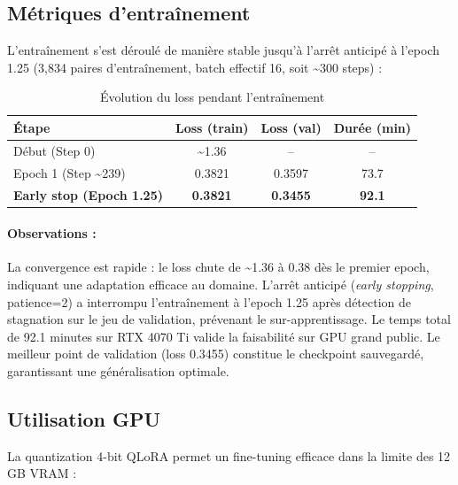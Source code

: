 \subsection{Métriques d'entraînement}

L'entraînement s'est déroulé de manière stable jusqu'à l'arrêt anticipé à l'epoch 1.25 (3{,}834 paires d'entraînement, batch effectif 16, soit \textasciitilde{}300 steps) :

\begin{table}[H]
\centering
\caption{Évolution du loss pendant l'entraînement}
\label{tab:training_loss}
\begin{tabular}{@{}lccc@{}}
\toprule
\textbf{Étape} & \textbf{Loss (train)} & \textbf{Loss (val)} & \textbf{Durée (min)} \\ \midrule
Début (Step 0) & \textasciitilde{}1.36 & -- & -- \\
Epoch 1 (Step \textasciitilde{}239) & 0.3821 & 0.3597 & 73.7 \\
\textbf{Early stop (Epoch 1.25)} & \textbf{0.3821} & \textbf{0.3455} & \textbf{92.1} \\
\bottomrule
\end{tabular}
\end{table}

\paragraph{Observations :}
La convergence est rapide : le loss chute de \textasciitilde{}1.36 à 0.38 dès le premier epoch, indiquant une adaptation efficace au domaine. L'arrêt anticipé (\textit{early stopping}, patience=2) a interrompu l'entraînement à l'epoch 1.25 après détection de stagnation sur le jeu de validation, prévenant le sur-apprentissage. Le temps total de 92.1 minutes sur RTX 4070 Ti valide la faisabilité sur GPU grand public. Le meilleur point de validation (loss 0.3455) constitue le checkpoint sauvegardé, garantissant une généralisation optimale.

\subsection{Utilisation GPU}

La quantization 4-bit QLoRA permet un fine-tuning efficace dans la limite des 12 GB VRAM :

